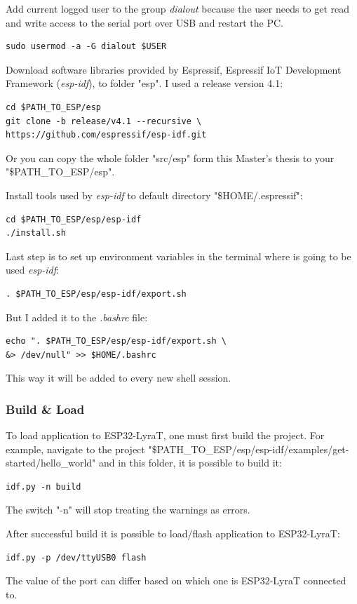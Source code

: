 \documentclass[thesis=M,english]{FITthesis}[2019/12/23]
\begin{document}
\bigskip
\noindent
Add current logged user to the group \textit{dialout} because the user needs to get read and write access to the serial port over USB and restart the PC.
\begin{lstlisting}[frame=single]
sudo usermod -a -G dialout $USER
\end{lstlisting}

\bigskip
\noindent
Download software libraries provided by Espressif, Espressif IoT Development Framework (\textit{esp-idf}), to folder "esp". I used a release version 4.1:
\begin{lstlisting}[frame=single]
cd $PATH_TO_ESP/esp
git clone -b release/v4.1 --recursive \
https://github.com/espressif/esp-idf.git
\end{lstlisting}
Or you can copy the whole folder "src/esp" form this Master's thesis to your "\$PATH\_TO\_ESP/esp".

\bigskip
\noindent
Install tools used by \textit{esp-idf} to default directory "\$HOME/.espressif":
\begin{lstlisting}[frame=single]
cd $PATH_TO_ESP/esp/esp-idf
./install.sh
\end{lstlisting}

\bigskip
\noindent
Last step is to set up environment variables in the terminal where is going to be used \textit{esp-idf}:
\begin{lstlisting}[frame=single]
. $PATH_TO_ESP/esp/esp-idf/export.sh
\end{lstlisting}
But I added it to the \textit{.bashrc} file:
\begin{lstlisting}[frame=single]
echo ". $PATH_TO_ESP/esp/esp-idf/export.sh \
&> /dev/null" >> $HOME/.bashrc
\end{lstlisting}
This way it will be added to every new shell session.

\subsubsection{Build \& Load}
To load application to ESP32-LyraT, one must first build the project. For example, navigate to the project "\$PATH\_TO\_ESP/esp/esp-idf/examples/get-started/hello\_world" and in this folder, it is possible to build it:
\begin{lstlisting}[frame=single]
idf.py -n build
\end{lstlisting}
The switch "-n" will stop treating the warnings as errors.

\bigskip
\noindent
After successful build it is possible to load/flash application to ESP32-LyraT:
\begin{lstlisting}[frame=single]
idf.py -p /dev/ttyUSB0 flash
\end{lstlisting}
The value of the port can differ based on which one is ESP32-LyraT connected to.
\end{document}
